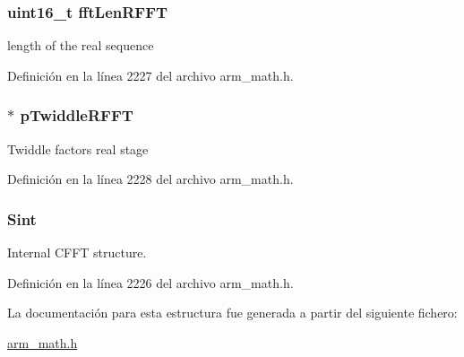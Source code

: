 \subsubsection[{\texorpdfstring{fft\+Len\+R\+F\+FT}{fftLenRFFT}}]{\setlength{\rightskip}{0pt plus 5cm}uint16\+\_\+t fft\+Len\+R\+F\+FT}\hypertarget{structarm__rfft__fast__instance__f32_a174f8c72d545034e19ba4ced52b31353}{}\label{structarm__rfft__fast__instance__f32_a174f8c72d545034e19ba4ced52b31353}
length of the real sequence 

Definición en la línea 2227 del archivo arm\+\_\+math.\+h.

\subsubsection[{\texorpdfstring{p\+Twiddle\+R\+F\+FT}{pTwiddleRFFT}}]{$\ast$ p\+Twiddle\+R\+F\+FT}\hypertarget{structarm__rfft__fast__instance__f32_a43370fe848d06993faf834da07ca91ce}{}\label{structarm__rfft__fast__instance__f32_a43370fe848d06993faf834da07ca91ce}
Twiddle factors real stage 

Definición en la línea 2228 del archivo arm\+\_\+math.\+h.

\subsubsection[{\texorpdfstring{Sint}{Sint}}]{ Sint}\hypertarget{structarm__rfft__fast__instance__f32_aa8a05a9fabc3852e5d476152a5067e53}{}\label{structarm__rfft__fast__instance__f32_aa8a05a9fabc3852e5d476152a5067e53}
Internal C\+F\+FT structure. 

Definición en la línea 2226 del archivo arm\+\_\+math.\+h.



La documentación para esta estructura fue generada a partir del siguiente fichero\+:\begin{DoxyCompactItemize}
\item 
\hyperlink{arm__math_8h}{arm\+\_\+math.\+h}\end{DoxyCompactItemize}
